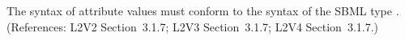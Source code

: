 The syntax of  attribute values must conform to the syntax of the
SBML type .  (References: L2V2 Section~3.1.7;
L2V3 Section~3.1.7; L2V4 Section~3.1.7.)
